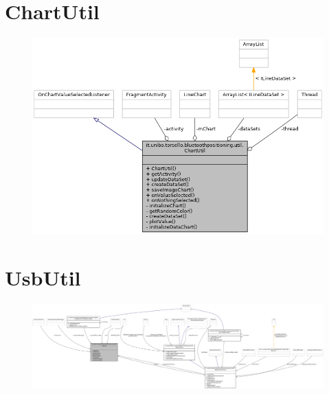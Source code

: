 \section{ChartUtil}
\begin{figure}[ph]
	\centering
	\includegraphics[width=1.2\linewidth]{img/uml/class/classit_1_1unibo_1_1torsello_1_1bluetoothpositioning_1_1util_1_1ChartUtil__coll__graph.png}
	\caption{}
\end{figure}

\newpage
\section{UsbUtil}
\begin{figure}[ph]
	\includegraphics[width=1.25\linewidth]{img/uml/class/classit_1_1unibo_1_1torsello_1_1bluetoothpositioning_1_1util_1_1UsbUtil__coll__graph.png}
	\caption{}
\end{figure}


	
